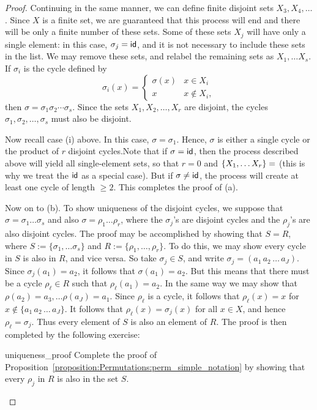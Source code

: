 \begin{proof}
Continuing in
the same manner, we can define finite disjoint sets $X_3, X_4, \ldots$.
Since $X$ is a finite set, we are guaranteed that this process will
end and there will be only a finite number of these sets. Some of these sets $X_j$ will have only a single element: in this case, $\sigma_j= \sf{id}$, and it is 
not necessary to include these sets in the list. We may remove these sets, and relabel the remaining sets as $X_1,\ldots X_s$.  If
$\sigma_i$ is the cycle defined by 
\[
\sigma_i( x )
= \left\{
\begin{array}{ll}
\sigma( x ) & x \in X_i \\
x & x \notin X_i,
\end{array}
\right.
\]
then $\sigma = \sigma_1 \sigma_2 \cdots \sigma_s$. Since the sets
$X_1, X_2, \ldots, X_r$ are disjoint, the cycles $\sigma_1, \sigma_2,
\ldots, \sigma_s$ must also be disjoint.  

Now recall case (i) above. In this case,  $\sigma = \sigma_1$.  Hence, $\sigma$ is either a single cycle or the product of $r$ disjoint cycles.Note that if $\sigma = \sf{id}$, then the process described above will yield all single-element sets, so that $r=0$ and $\{X_1,\ldots X_r\}=\empty$ (this is why we treat the $\sf{id}$ as a special case). But if $\sigma \neq \sf{id}$, the process will create at least one cycle of length $\ge 2$. This completes the proof of (a).


Now on to (b).  To show uniqueness of the disjoint cycles, we suppose that $\sigma = \sigma_1 \ldots \sigma_s$ and also $\sigma = \rho_1 \ldots \rho_r$, where the $\sigma_j$'s are disjoint cycles and the $\rho_j$'s are also disjoint cycles.  The proof may be accomplished by showing that $S = R$, where $S := \{\sigma_1,\ldots \sigma_s \}$ and $R  := \{\rho_1,\ldots,\rho_r\}$. To do this, we may show every cycle in $S$ is also in $R$, and vice versa. So take $\sigma_j \in S$, and write $\sigma_j =(a_1 \, a_2 \, \ldots \, a_J)$. Since $\sigma_j(a_1) = a_2$, it follows that $\sigma(a_1) = a_2$. But this means that there must be a cycle $\rho_\ell \in R$ such that $\rho_\ell(a_1) = a_2$.  In the same way we may show that $\rho(a_2) = a_3, \ldots \rho(a_J)=a_1$. Since $\rho_{\ell}$ is a cycle, it follows that $\rho_{\ell}(x) = x$ for $x \notin \{a_1 \, a_2 \, \ldots \, a_J\}$. It follows that    $\rho_\ell(x) = \sigma_j(x)$ for all $x \in X$, and hence $\rho_\ell = \sigma_j$.  Thus every element of $S$ is also an element of $R$.  The proof is then completed by the following exercise:

\begin{exercise}{uniqueness_proof}
Complete the proof of Proposition~\ref{proposition:Permutations:perm_simple_notation} by showing that every $\rho_j$ in $R$ is also in the set $S$.
\end{exercise}  

\end{proof}
\medskip



